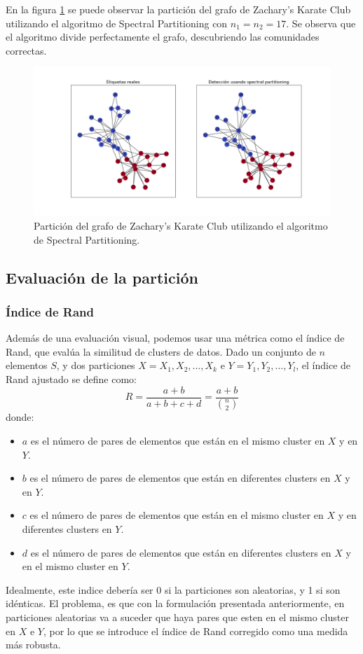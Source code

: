 \documentclass{article}
\begin{document}
En la figura \ref{fig: spectral_partitioning} se puede observar la partición del grafo de Zachary's Karate Club utilizando el algoritmo de Spectral Partitioning con $n_1 = n_2 = 17$. Se observa que el algoritmo divide perfectamente el grafo, descubriendo las comunidades correctas.

\begin{figure}[htb]
    \centering
    \includegraphics[width=\textwidth]{imagenes/spectral_partitioning.png}
    \caption{Partición del grafo de Zachary's Karate Club utilizando el algoritmo de Spectral Partitioning.}
    \label{fig: spectral_partitioning}
\end{figure}

\subsection{Evaluación de la partición}

\subsubsection{Índice de Rand}

Además de una evaluación visual, podemos usar una métrica como el índice de Rand, que evalúa la similitud de clusters de datos. Dado un conjunto de $n$ elementos $S$, y dos particiones $X = {X_1, X_2, \ldots, X_k}$ e $Y = {Y_1, Y_2, \ldots, Y_l}$, el índice de Rand ajustado se define como:
\begin{equation*}
    R = \frac{a + b}{a + b + c + d} = \frac{a + b}{\binom{n}{2}}
\end{equation*}
donde:
\begin{itemize}
    \item $a$ es el número de pares de elementos que están en el mismo cluster en $X$ y en $Y$.
    \item $b$ es el número de pares de elementos que están en diferentes clusters en $X$ y en $Y$.
    \item $c$ es el número de pares de elementos que están en el mismo cluster en $X$ y en diferentes clusters en $Y$.
    \item $d$ es el número de pares de elementos que están en diferentes clusters en $X$ y en el mismo cluster en $Y$.
\end{itemize}
Idealmente, este indice debería ser 0 si la particiones son aleatorias, y 1 si son idénticas. El problema, es que con la formulación presentada anteriormente, en particiones aleatorias va a suceder que haya pares que esten en el mismo cluster en $X$ e $Y$, por lo que se introduce el índice de Rand corregido como una medida más robusta. 
\end{document}

